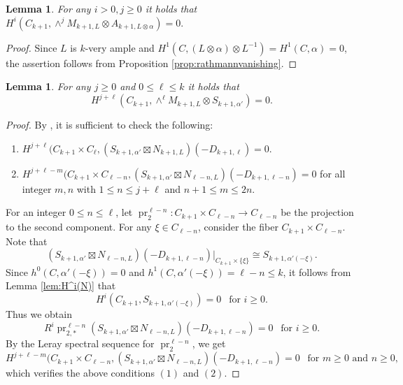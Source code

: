 \documentclass[12pt]{amsart}
\newcounter{thmcounter}
\numberwithin{equation}{section}
\numberwithin{thmcounter}{section}
\newtheorem{lemma}[thmcounter]{Lemma}
\theoremstyle{definition}
\theoremstyle{claim}
\DeclareMathOperator{\pr}{pr}
\begin{document}
\begin{lemma}\label{lemma:cohvanMA}
For any $i>0,j\geq 0$ it holds that
$
H^i(C_{k+1}, \wedge^j M_{k+1,L} \otimes A_{k+1,L \otimes \alpha})=0.
$
\end{lemma}

\begin{proof}
Since $L$ is $k$-very ample and $H^1(C,(L\otimes \alpha)\otimes L^{-1}) = H^1(C,\alpha)=0$, the assertion follows from Proposition \ref{prop:rathmannvanishing}.
\end{proof}

\begin{lemma}\label{lemma:wedgeMSvanishing}
	For any $j\geq 0$ and $0\leq \ell\leq k$ it holds that
	$$
	H^{j+\ell}(C_{k+1}, \wedge^{\ell} M_{k+1,L} \otimes S_{k+1,\alpha'})=0.
	$$
\end{lemma}

\begin{proof}
	By \cite[Proposition 3.1]{NP}, it is sufficient to check the following:
	\begin{enumerate}
		\item $H^{j+\ell}(C_{k+1} \times C_{\ell}, (S_{k+1, \alpha'} \boxtimes N_{k+1,L})(-D_{k+1, \ell})=0$.
		\item $H^{j+\ell-m}(C_{k+1} \times C_{\ell-n}, (S_{k+1,\alpha'} \boxtimes N_{\ell-n, L})(-D_{k+1, \ell-n})=0$ for all integer $m,n$ with $1 \leq n \leq j+\ell$ and $n+1 \leq m \leq 2n$.
	\end{enumerate}
	For an integer $0 \leq n \leq \ell$, let $\pr_2^{\ell-n} \colon C_{k+1} \times C_{\ell-n} \to C_{\ell-n}$ be the projection to the second component. For any $\xi \in C_{\ell-n}$, consider the fiber $C_{k+1}\times C_{\ell-n}$. Note that
	$$
	(S_{k+1,\alpha'} \boxtimes N_{\ell-n, L})(-D_{k+1, \ell-n})|_{C_{k+1}\times \{\xi\}} \cong S_{k+1, \alpha'(-\xi)}.
	$$
	Since $h^0(C, \alpha'(-\xi))=0$ and $h^1(C, \alpha'(-\xi))=\ell-n \leq k$, it follows from Lemma \ref{lem:H^i(N)} that
	$$
	H^i(C_{k+1}, S_{k+1, \alpha'(-\xi)})=0~~\text{ for $i \geq 0$}.
	$$
	Thus we obtain
	$$
	R^i \pr_{2,*}^{\ell-n} (S_{k+1,\alpha'} \boxtimes N_{\ell-n, L})(-D_{k+1, \ell-n}) = 0~~\text{ for $i \geq 0$}.
	$$
	By the Leray spectral sequence for $\pr_2^{\ell-n}$, we get
	$$
	H^{j+\ell-m}(C_{k+1} \times C_{\ell-n}, (S_{k+1,\alpha'} \boxtimes N_{\ell-n, L})(-D_{k+1, \ell-n})=0~~\text{ for $m \geq 0$ and $n \geq 0$},
	$$
	which verifies the above conditions $(1)$ and $(2)$.
\end{proof}
\end{document}
